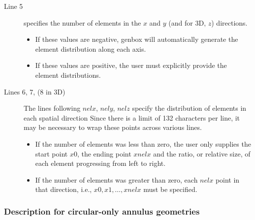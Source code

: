 \begin{description}

  \item[Line 5] specifies the number of elements in the $x$ and $y$ (and for
    3D, $z$) directions.  
    
    \begin{itemize}

      \item If these values are negative, genbox will automatically generate
        the element distribution along each axis. 

      \item If these values are positive, the user must explicitly provide the
        element distributions.  

    \end{itemize}
    

  \item[Lines 6, 7, (8 in 3D)] The lines following $nelx$, $nely$, $nelz$
    specify the distribution of elements in each spatial direction Since there
    is a limit of 132 characters per line, it may be necessary to wrap these
    points across various lines.

    \begin{itemize}

      \item If the number of elements was less than zero, the user only
        supplies the start point $x0$, the ending point $xnelx$ and the ratio,
        or relative size, of each element progressing from left to right.  

      \item If the number of elements was greater than zero, each $nelx$ point
        in that direction, i.e., $x0, x1, \ldots, xnelx$ must be specified.

    \end{itemize}

\end{description}

\subsubsection{Description for circular-only annulus geometries}

